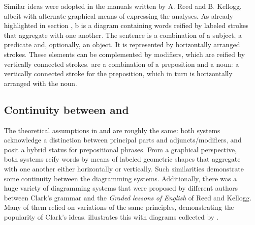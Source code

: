 \documentclass[english,output=paper,colorlinks,citecolor=brown]{../langscibook}
\begin{document}
Similar ideas were adopted in the manuals written by A. Reed and B. Kellogg, albeit with alternate graphical means of expressing the analyses. As already highlighted in section , b is a diagram containing words reified by labeled strokes that aggregate with one another. The sentence is a combination of a subject, a predicate and, optionally, an object. It is represented by horizontally arranged strokes. These elements can be complemented by modifiers, which are reified by vertically connected strokes.  are a combination of a preposition and a noun: a vertically connected stroke for the preposition, which in turn is horizontally arranged with the noun. 

\subsection{Continuity between \citet{Clark1847} and \citet{ReedBrainerd1879}}\label{sec:4:3.2}
\largerpage
The theoretical assumptions in \citet{Clark1847} and \citet{ReedBrainerd1879} are roughly the same: both systems acknowledge a distinction between principal parts and adjuncts/modifiers, and posit a hybrid status for prepositional phrases. From a graphical perspective, both systems reify words by means of labeled geometric shapes that aggregate with one another either horizontally or vertically. Such similarities demonstrate some continuity between the dia\-gramming systems. Additionally, there was a huge variety of dia\-gramming systems that were proposed by different authors between Clark’s grammar and the \textit{Graded lessons of English} of Reed and Kellogg. Many of them relied on variations of the same principles, demonstrating the popularity of Clark’s ideas.  illustrates this with diagrams collected by \citet[37, 56, 75]{Brittain1973}.
\end{document}
